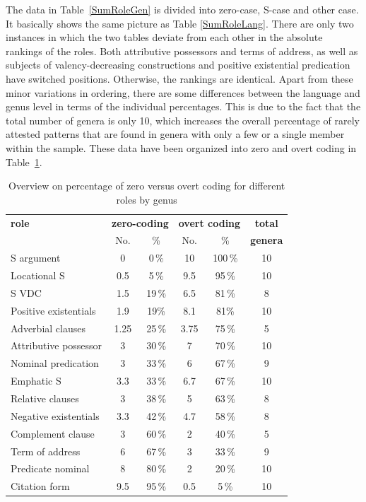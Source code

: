 The data in Table~\ref{SumRoleGen} is divided into zero-case, S-case and other case. 
It basically shows the same picture as Table \ref{SumRoleLang}. 
There are only two instances in which the two tables deviate from each other in the absolute rankings of the roles. 
Both attributive possessors and terms of address, as well as subjects of valency-decreasing constructions and positive existential predication have switched positions.
Otherwise, the rankings are identical.
Apart from these minor variations in ordering, there are some differences between the language and genus level in terms of the individual percentages. 
This is due to the fact that the total number of genera is only 10, which increases the overall percentage of rarely attested patterns that are found in genera with only a few or a single member within the sample. 
These data have been organized into zero and overt coding in Table~\ref{SumRoleGenOvert}.

\begin{table}[t,b,h]
\begin{center}
{\caption{Overview on percentage of zero versus overt coding for different roles by genus}\label{SumRoleGenOvert}
\begin{tabular}{lccccc}
\hline \hline
\bfseries role &\multicolumn{2}{c}{\bfseries zero-coding} &\multicolumn{2}{c}{\bfseries overt coding} &\bfseries total \\
{}& No.& \% &No. & \% & \bfseries genera \\
\hline
S argument &0  &0\,\% &10  &100\,\%  & 10\\
Locational S &0.5  &5\,\% &9.5  &95\,\% &10\\
S VDC&1.5  &19\,\% &6.5  &81\,\% &8\\
Positive existentials&1.9  &19\% &8.1  &81\% &10\\
Adverbial clauses&1.25  &25\,\% &3.75  &75\,\% &5\\
Attributive possessor&3  &30\,\% &7  &70\,\% &10\\
Nominal predication&3  &33\,\% &6  &67\,\% &9\\
Emphatic S&3.3  &33\,\% &6.7  &67\,\% &10\\
Relative clauses&3  &38\,\% &5  &63\,\% &8\\
Negative existentials&3.3  &42\,\% &4.7  &58\,\% &8\\
Complement clause&3  &60\,\% &2  &40\,\% &5\\
Term of address&6  &67\,\% &3  &33\,\% &9\\
Predicate nominal&8  &80\,\% &2  &20\,\% &10\\
Citation form&9.5  &95\,\% &0.5  &5\,\% &10\\
\hline \hline
\end{tabular}
}
\end{center}
\end{table}

